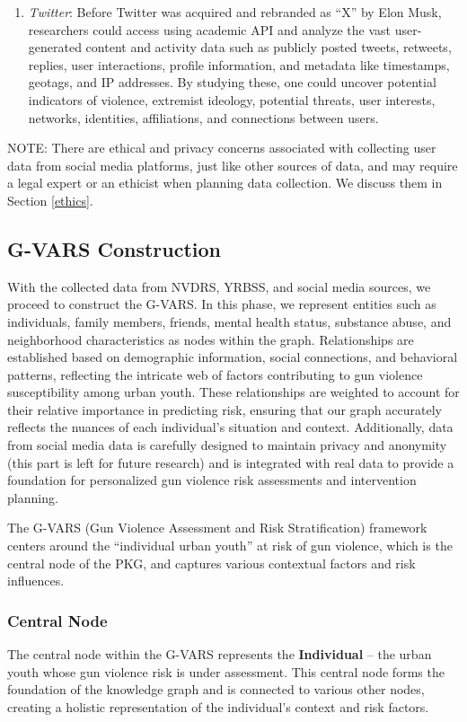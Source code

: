 \documentclass[11pt]{article}
\begin{document}
\begin{enumerate}
    \item \textit{Twitter}: Before Twitter was acquired and rebranded as ``X'' by Elon Musk, researchers could access using academic API and analyze the vast user-generated content and activity data such as publicly posted tweets, retweets, replies, user interactions, profile information, and metadata like timestamps, geotags, and IP addresses. By studying these, one could uncover potential indicators of violence, extremist ideology, potential threats, user interests, networks, identities, affiliations, and connections between users. 

\end{enumerate}

NOTE: There are ethical and privacy concerns associated with collecting user data from social media platforms, just like other sources of data, and may require a legal expert or an ethicist when planning data collection. We discuss them in Section \ref{ethics}.

\subsection{\textsf{G-VARS} Construction}

With the collected data from NVDRS, YRBSS, and social media sources, we proceed to construct the \textsf{G-VARS}. In this phase, we represent entities such as individuals, family members, friends, mental health status, substance abuse, and neighborhood characteristics as nodes within the graph. Relationships are established based on demographic information, social connections, and behavioral patterns, reflecting the intricate web of factors contributing to gun violence susceptibility among urban youth. These relationships are weighted to account for their relative importance in predicting risk, ensuring that our graph accurately reflects the nuances of each individual's situation and context. Additionally, data from social media data is carefully designed to maintain privacy and anonymity (this part is left for future research) and is integrated with real data to provide a foundation for personalized gun violence risk assessments and intervention planning.
\par
The \textsf{G-VARS} (Gun Violence Assessment and Risk Stratification) framework centers around the ``individual urban youth'' at risk of gun violence, which is the central node of the PKG, and captures various contextual factors and risk influences.

\subsubsection*{Central Node} The central node within the \textsf{G-VARS} represents the \textbf{Individual} – the urban youth whose gun violence risk is under assessment. This central node forms the foundation of the knowledge graph and is connected to various other nodes, creating a holistic representation of the individual's context and risk factors.
\end{document}
